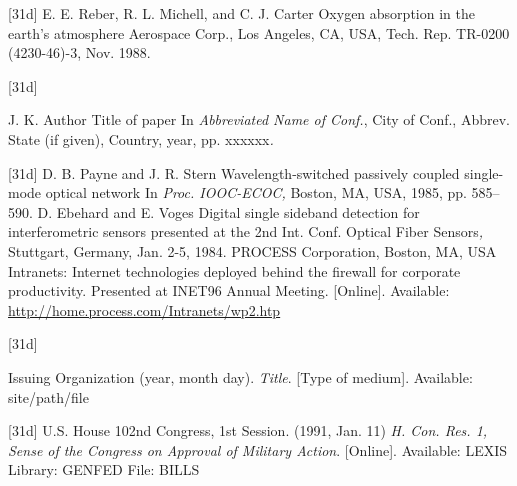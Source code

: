 \documentclass[correspondence]{IEEEtaes}
\begin{document}
\vspace*{-12pt}
\begin{thebibliography}{[31d]}
\setcounter{enumiv}{12}
E. E. Reber, R. L. Michell, and C. J. Carter
\newblock Oxygen absorption in the earth's atmosphere
\newblock Aerospace Corp., Los Angeles, CA, USA, Tech. Rep. TR-0200 (4230-46)-3, Nov. 1988.
\end{thebibliography}

\vspace*{-12pt}
\begin{thebibliography}{[31d]}
\item[] J. K. Author
\newblock Title of paper
\newblock In \emph{Abbreviated Name of Conf.}, City of Conf., Abbrev. State (if given), Country, year, pp. xxxxxx\emph{.}
\end{thebibliography}

\vspace*{-12pt}
\begin{thebibliography}{[31d]}
\setcounter{enumiv}{13}
D. B. Payne and J. R. Stern
\newblock Wavelength-switched passively coupled single-mode optical network
\newblock In \emph{Proc. IOOC-ECOC,} Boston, MA, USA, 1985, pp. 585--590.
D. Ebehard and E. Voges
\newblock Digital single sideband detection for interferometric sensors
\newblock presented at the 2nd Int. Conf. Optical Fiber Sensors\emph{,} Stuttgart, Germany, Jan. 2-5, 1984.
PROCESS Corporation, Boston, MA, USA
\newblock Intranets: Internet technologies deployed behind the firewall for corporate productivity. Presented at INET96 Annual Meeting. {[}Online{]}. Available: \href{http://home.process.com/Intranets/wp2.htp}{\url{http://home.process.com/Intranets/wp2.htp}}
\end{thebibliography}

\vspace*{-12pt}
\begin{thebibliography}{[31d]}
\item[] Issuing Organization
\newblock (year, month day). \emph{Title}. {[}Type of medium{]}. Available: site/path/file
\end{thebibliography}

\vspace*{-12pt}
\begin{thebibliography}{[31d]}
\setcounter{enumiv}{16}
U.S. House
\newblock 102nd Congress, 1st Session. (1991, Jan. 11)
\newblock\emph{H. Con. Res. 1, Sense of the Congress on Approval of Military Action}. {[}Online{]}. Available: LEXIS Library: GENFED File: BILLS
\end{thebibliography}
\end{document}
